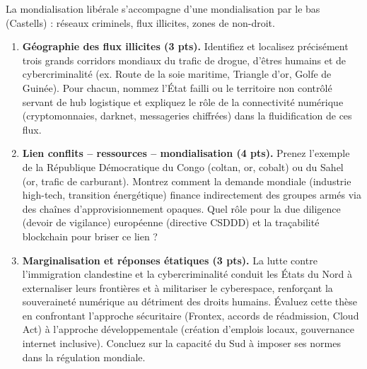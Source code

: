 \documentclass[11pt]{article}
\begin{document}
\begin{exercice}
\noindent La mondialisation libérale s'accompagne d'une \og mondialisation par le bas \fg (Castells) : réseaux criminels, flux illicites, zones de non-droit.

\begin{enumerate}
\item \textbf{Géographie des flux illicites (3 pts).} Identifiez et localisez précisément trois grands corridors mondiaux du trafic de drogue, d'êtres humains et de cybercriminalité (ex. Route de la soie maritime, Triangle d'or, Golfe de Guinée). Pour chacun, nommez l'État failli ou le territoire non contrôlé servant de \og hub \fg logistique et expliquez le rôle de la connectivité numérique (cryptomonnaies, darknet, messageries chiffrées) dans la fluidification de ces flux.
\item \textbf{Lien conflits -- ressources -- mondialisation (4 pts).} Prenez l'exemple de la République Démocratique du Congo (coltan, or, cobalt) ou du Sahel (or, trafic de carburant). Montrez comment la demande mondiale (industrie high-tech, transition énergétique) finance indirectement des groupes armés via des chaînes d'approvisionnement opaques. Quel rôle pour la \og due diligence \fg (devoir de vigilance) européenne (directive CSDDD) et la traçabilité blockchain pour briser ce lien ?
\item \textbf{Marginalisation et réponses étatiques (3 pts).} \og La lutte contre l'immigration clandestine et la cybercriminalité conduit les États du Nord à externaliser leurs frontières et à militariser le cyberespace, renforçant la souveraineté numérique au détriment des droits humains. \fg Évaluez cette thèse en confrontant l'approche sécuritaire (Frontex, accords de réadmission, Cloud Act) à l'approche développementale (création d'emplois locaux, gouvernance internet inclusive). Concluez sur la capacité du Sud à imposer ses normes dans la régulation mondiale.
\end{enumerate}
\end{exercice}
\end{document}
